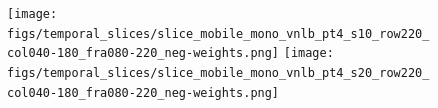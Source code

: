 \documentclass[10pt, a4paper]{article}
\begin{document}
\begin{figure}[thpb!]
\begin{center}
		               \hspace{0.2\textwidth}%
		\texttt{[image: figs/temporal\_slices/slice\_mobile\_mono\_vnlb\_pt4\_s10\_row220\_col040-180\_fra080-220\_neg-weights.png]}%
		\texttt{[image: figs/temporal\_slices/slice\_mobile\_mono\_vnlb\_pt4\_s20\_row220\_col040-180\_fra080-220\_neg-weights.png]}%

\end{center}
\end{figure}
\end{document}
